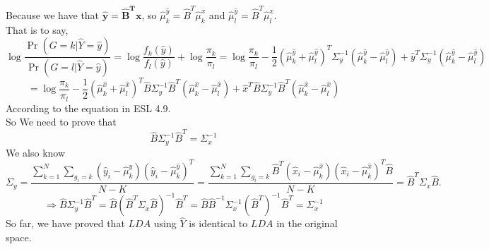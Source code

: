     \begin{solution}
        Because we have that $\mathbf{\hat{y}}= \mathbf{\hat{B}^{T}}\mathbf{x}$, so $\hat{\mu}_{k}^{\hat{y}}=\hat{B}^{T}\hat{\mu}_{k}^{x}$ and $\hat{\mu}_{l}^{\hat{y}}=\hat{B}^{T}\hat{\mu}_{l}^{x}$.\\
        That is to say,
        \[\log{\frac{\Pr(G=k|\hat{Y}=\hat{y})}{\Pr(G=l|\hat{Y}=\hat{y})}}=\log{\frac{f_{k}(\hat{y})}{f_{l}(\hat{y})}}+\log{\frac{\pi_{k}}{\pi_{l}}}=\log{\frac{\pi_{k}}{\pi_{l}}}-\frac{1}{2}(\hat{\mu}_{k}^{\hat{y}}+\hat{\mu}_{l}^{\hat{y}})^{T}\Sigma^{-1}_{y}(\hat{\mu}_{k}^{\hat{y}}-\hat{\mu}_{l}^{\hat{y}})+\hat{y}^{T}\Sigma^{-1}_{y}(\hat{\mu}_{k}^{\hat{y}}-\hat{\mu}_{l}^{\hat{y}})\]
        \[=\log{\frac{\pi_{k}}{\pi_{l}}}-\frac{1}{2}(\hat{\mu}_{k}^{\hat{x}}+\hat{\mu}_{l}^{\hat{x}})^{T}\hat{B}\Sigma^{-1}_{y}\hat{B}^{T}(\hat{\mu}_{k}^{\hat{x}}-\hat{\mu}_{l}^{\hat{x}})+\hat{x}^{T}\hat{B}\Sigma^{-1}_{y}\hat{B}^{T}(\hat{\mu}_{k}^{\hat{x}}-\hat{\mu}_{l}^{\hat{x}})\]
        According to the equation in ESL 4.9.\\
        So We need to prove that
        \[\hat{B}\Sigma^{-1}_{y}\hat{B}^{T}=\Sigma^{-1}_{x}\]
        We also know
        \[\Sigma_{y}=\frac{\sum_{k=1}^{N}\sum_{g_{i}=k}(\hat{y}_{i}-\hat{\mu}_{k}^{\hat{y}})(\hat{y}_{i}-\hat{\mu}_{k}^{\hat{y}})^{T}}{N-K}=\frac{\sum_{k=1}^{N}\sum_{g_{i}=k}\hat{B}^{T}(\hat{x}_{i}-\hat{\mu}_{k}^{\hat{x}})(\hat{x}_{i}-\hat{\mu}_{k}^{\hat{x}})^{T}\hat{B}}{N-K}=\hat{B}^{T}\Sigma_{x}\hat{B}.\]
        \[\Rightarrow\hat{B}\Sigma^{-1}_{y}\hat{B}^{T}=\hat{B}(\hat{B}^{T}\Sigma_{x}\hat{B})^{-1}\hat{B}^{T}=\hat{B}\hat{B}^{-1}\Sigma_{x}^{-1}(\hat{B}^{T})^{-1}\hat{B}^{T}=\Sigma^{-1}_{x}\]
        So far, we have proved that $LDA$ using $\hat{Y}$ is identical to $LDA$ in the original space.
    \end{solution}
